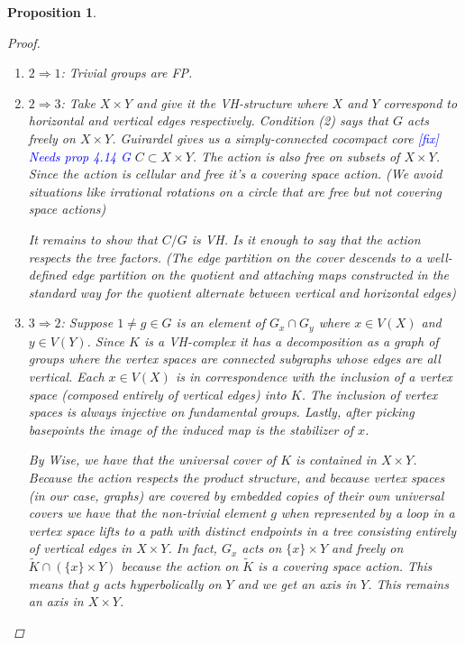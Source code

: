 \documentclass{article}
\theoremstyle{mystyle}
\newtheorem{pro}{Proposition}
\newtheorem*{claim*}{Claim}
\theoremstyle{remark}
\begin{document}
\begin{pro}
\begin{proof}
\begin{enumerate}
    \begin{claim*}
    The action of $G_{x_0}$ on $Y$ is non-trivial.
    \begin{proof}
        Suppose the action were trivial. That is, there exists some $y\in V(Y)$ such that $(G_{x_0})_y=G_{x_0}$. Hence, $G_{x_0}$ is elliptic for the action of $G$ on $Y$. By the local finiteness of $Y$, for all $x\in V(X)$ $G_x$ acts elliptically on $Y$. Hence, $\mathcal{E}(X)\subset \mathcal{E}(Y)$. Again by local finiteness we can promote this using \ref{lem:promoteelliptic} to $\mathcal{E}(X) = \mathcal{E}(Y)$ which by theorem \ref{thm:forester} gives $X \sim Y$ which contradicts the fact that $X$ and $Y$ were assumed to be in different deformation spaces.
    \end{proof}
    \end{claim*}
    \item $2\Rightarrow 1$: Trivial groups are FP.
    \item $2\Rightarrow 3$: Take $X \times Y$ and give it the VH-structure where $X$ and $Y$ correspond to horizontal and vertical edges respectively. Condition (2) says that $G$ acts freely on $X\times Y$. Guirardel gives us a simply-connected cocompact core \textcolor{blue}{[fix] Needs prop 4.14 G} $C \subset X \times Y$. The action is also free on subsets of $X \times Y$. Since the action is cellular and free it's a covering space action. (We avoid situations like irrational rotations on a circle that are free but not covering space actions) 
    
    It remains to show that $C/G$ is VH. Is it enough to say that the action respects the tree factors. (The edge partition on the cover descends to a well-defined edge partition on the quotient and attaching maps constructed in the standard way for the quotient alternate between vertical and horizontal edges)
    
\item $3\Rightarrow 2$: Suppose $1\neq g \in G$ is an element of $G_x\cap G_y$ where $x \in V(X)$ and $y\in V(Y)$. Since $K$ is a VH-complex it has a decomposition as a graph of groups where the vertex spaces are connected subgraphs whose edges are all vertical. Each $x \in V(X)$ is in correspondence with the inclusion of a vertex space (composed entirely of vertical edges) into $K$. The inclusion of vertex spaces is always injective on fundamental groups. Lastly, after picking basepoints the image of the induced map is the stabilizer of $x$.
    
    By Wise, we have that the universal cover of $K$ is contained in $X \times Y$. Because the action respects the product structure, and because vertex spaces (in our case, graphs) are covered by embedded copies of their own universal covers we have that the non-trivial element $g$ when represented by a loop in a vertex space lifts to a path with distinct endpoints in a tree consisting entirely of vertical edges in $X \times Y$. In fact, $G_x$ acts on $\{x\}\times Y$ and freely on $\widetilde{K} \cap (\{x\}\times Y)$ because the action on $\widetilde{K}$ is a covering space action. This means that $g$ acts hyperbolically on $Y$ and we get an axis in $Y$. This remains an axis in $X \times Y$.
    

\end{enumerate}
\end{proof}
\end{pro}
\end{document}
